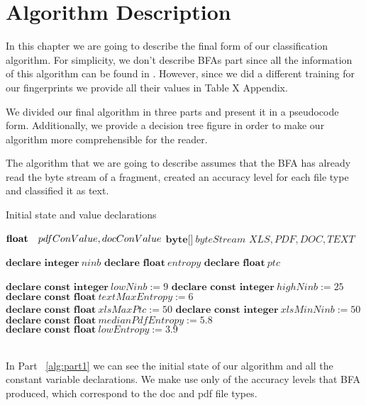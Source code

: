 \chapter{Algorithm Description}\label{chap:5}


\makeatletter
\renewcommand{\ALG@beginalgorithmic}{\footnotesize}
\renewcommand{\ALG@name}{Algorithm - Part}
\makeatother


In this chapter we are going to describe the final form of our classification algorithm. For simplicity, we don't describe BFAs part since all the information of this algorithm can be found in \cite{MacDaniel}. However, since we did a different training for our fingerprints we provide all their values in Table X Appendix.

We divided our final algorithm in three parts and present it in a pseudocode form. Additionally, we provide a decision tree figure in order to make our algorithm more comprehensible for the reader.

The algorithm that we are going to describe assumes that the BFA has already read the byte stream of a fragment, created an accuracy level for each file type and classified it as text. 

\pagebreak

\begin{algorithm}
\caption{Initial state and value declarations\label{alg:part1}}
\begin{algorithmic}[1]

\Require$\newline \textbf{float} \ \ \ pdfConValue, docConValue$ 
\newline $\textbf{byte[]} \   byteStream$
\newline
\Ensure$XLS, PDF, DOC, TEXT$
\newline

\State$\textbf{declare integer} \ ninb$
\State$\textbf{declare float} \ entropy$
\State$\textbf{declare float} \ ptc$
\newline

\State$\textbf{declare const integer} \ lowNinb:= 9$
\State$\textbf{declare const integer} \ highNinb:= 25$
\State$\textbf{declare const float} \ textMaxEntropy:= 6 $
\State$\textbf{declare const float} \ xlsMaxPtc:= 50$
\State$\textbf{declare const integer} \ xlsMinNinb:= 50$
\State$\textbf{declare const float} \ medianPdfEntropy:= 5.8$
\State$\textbf{declare const float} \ lowEntropy:= 3.9$

\end{algorithmic}
\end{algorithm}
~\\
In Part ~\ref{alg:part1} we can see the initial state of our algorithm and all the constant variable declarations. We make use only of the accuracy levels that BFA produced, which correspond to the doc and pdf file types.

